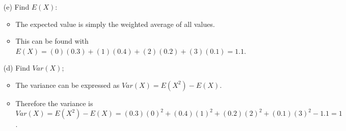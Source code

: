 \documentclass{article}
\begin{document}
\begin{enumerate}
\begin{enumerate}
        \end{enumerate}
    \item [(e)] Find $E(X)$:
        \begin{itemize}
        \item The expected value is simply the weighted average of all values.
        \item This can be found with $E(X) = (0)(0.3) + (1)(0.4) + (2)(0.2) + (3)(0.1) = 1.1$.
        \end{itemize}
    \item [(d)] Find $Var(X)$;
        \begin{itemize}
        \item The variance can be expressed as $Var(X) = E(X^2) - E(X)$.
        \item Therefore the variance is $Var(X) = E(X^2) - E(X)= (0.3)(0)^2 + (0.4)(1)^2 + (0.2)(2)^2 + (0.1)(3)^2 - 1.1= 1$.
        \end{itemize}


\end{enumerate}
\end{document}
